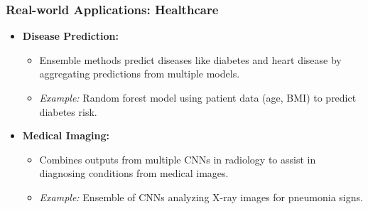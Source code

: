 \documentclass[aspectratio=169]{beamer}
\begin{document}
\begin{frame}[fragile]
  \frametitle{Real-world Applications: Healthcare}
  \begin{itemize}
    \item \textbf{Disease Prediction:}
      \begin{itemize}
        \item Ensemble methods predict diseases like diabetes and heart disease by aggregating predictions from multiple models.
        \item \textit{Example:} Random forest model using patient data (age, BMI) to predict diabetes risk.
      \end{itemize}
    \item \textbf{Medical Imaging:}
      \begin{itemize}
        \item Combines outputs from multiple CNNs in radiology to assist in diagnosing conditions from medical images.
        \item \textit{Example:} Ensemble of CNNs analyzing X-ray images for pneumonia signs.
      \end{itemize}
  \end{itemize}
\end{frame}
\end{document}
